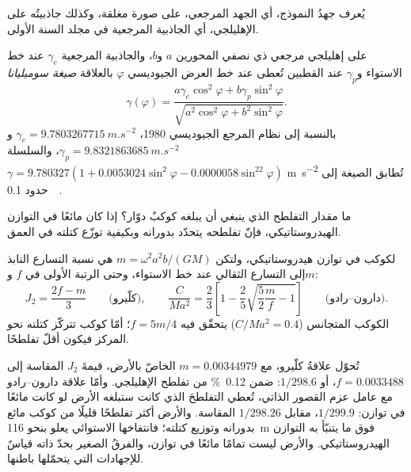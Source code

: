 يُعرف جهدُ النموذج، أي الجهد المرجعي، على صورة مغلقة، وكذلك
جاذبيتُه على الإهليلجي، أي الجاذبية المرجعية في مجلد السنة الأولى.

\begin{proposition}\label{prop:b3:gravity-geodesy:somigliana}
على إهليلجي مرجعي ذي نصفي المحورين $a$ و$b$، والجاذبية المرجعية
$\gamma_e$ عند خط الاستواء و$\gamma_p$ عند القطبين تُعطى عند
خط العرض الجيوديسي $\varphi$ بالعلاقة
\emph{صيغة سوميليانا}
\[
  \gamma(\varphi) = \frac{a\gamma_e\cos^2\varphi + b\gamma_p\sin^2\varphi}
  {\sqrt{a^2\cos^2\varphi + b^2\sin^2\varphi}} .
\]
بالنسبة إلى نظام المرجع الجيوديسي 1980، $\gamma_e = \qty{9.7803267715}{m.s^{-2}}$
و$\gamma_p = \qty{9.8321863685}{m.s^{-2}}$، والسلسلة
$\gamma = 9.780327(1 + 0.0053024\sin^2\varphi - 0.0000058\sin^22\varphi)$
\unit{m.s^{-2}} تُطابق الصيغة إلى حدود \qty{0.1}{\milli\gal}.
\end{proposition}
\admitted

ما مقدار التفلطح الذي ينبغي أن يبلغه كوكبٌ دوّار؟ إذا كان مائعًا في
التوازن الهيدروستاتيكي، فإنّ تفلطحه يتحدّد بدورانه وبكيفية توزّع كتلته
في العمق.

\begin{proposition}\label{prop:b3:gravity-geodesy:clairaut}
لكوكب في توازن هيدروستاتيكي، ولتكن $m = \omega^2a^2b/(GM)$ هي نسبة
التسارع النابذ إلى التسارع الثقالي عند خط الاستواء، وحتى الرتبة الأولى في
$f$ و$m$:
\[
  J_2 = \frac{2f - m}{3}\qquad\text{(كلّيرو)},\qquad
  \frac{C}{Ma^2} = \frac23\left[1 - \frac25\sqrt{\frac52\frac mf - 1}\right]
  \qquad\text{(دارون--رادو)} .
\]
الكوكب المتجانس ($C/Ma^2 = 0.4$) يتحقّق فيه $f = 5m/4$؛ أمّا كوكب تتركّز كتلته
نحو المركز فيكون أقلّ تفلطحًا.
\end{proposition}
\admitted

تُحوّل علاقةُ كلّيرو، مع $m = \num{0.00344979}$ الخاصّ بالأرض، قيمةَ
$J_2$ المقاسة إلى $f = \num{0.0033488}$، أو $1/298.6$: ضمن
\qty{0.12}{\percent} من تفلطح الإهليلجي. وأمّا علاقة دارون--رادو
مع عامل عزم القصور الذاتي، تُعطي التفلطحَ الذي كانت ستبلغه الأرض
لو كانت مائعًا في توازن: $1/299.9$، مقابل
$1/298.26$ المقاسة. والأرض أكثر تفلطحًا قليلًا من كوكب مائع بدورانه
وتوزيع كتلته؛ فانتفاخها الاستوائي يعلو بنحو
\qty{116}{m} فوق ما يتنبّأ به التوازن الهيدروستاتيكي. والأرض ليست
تمامًا مائعًا في توازن، والفرقُ الصغير بحدّ ذاته
قياسٌ للإجهادات التي يتحمّلها باطنها.

